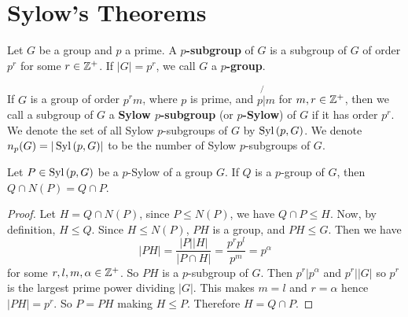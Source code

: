 \section{Sylow's Theorems}
\label{section_4.5}

\begin{definition}
  Let $G$ be a group and $p$ a prime. A  \textbf{$p$-subgroup} of $G$ is a
  subgroup of $G$ of order  $p^r$ for some $r \in \mathbb{Z}^+$. If $|G|=p^r$, we
  call  $G$ a  \textbf{$p$-group}.
\end{definition}

\begin{definition}
  If $G$ is a group of order  $p^rm$, where  $p$ is prime, and  $p \not{|} m$
  for  $m,r \in \mathbb{Z}^+$, then we call a subgroup of $G$ a \textbf{Sylow
  $p$-subgroup} (or \textbf{$p$-Sylow}) of $G$ if it has order $p^r$. We
  denote the set of all Sylow $p$-subgroups of $G$ by  $\operatorname{Syl}{(p,G)}$. We
  denote $n_p(G)=|\operatorname{Syl}{(p,G)}|$ to be the number of Sylow $p$-subgroups of
  $G$.
\end{definition}

\begin{proposition}\label{proposition_4.5.1}
  Let $P \in \operatorname{Syl}{(p,G)}$ be a $p$-Sylow of a group  $G$. If  $Q$ is a
  $p$-group of  $G$, then  $Q \cap N(P)=Q \cap P$.
\end{proposition}
\begin{proof}
  Let $H=Q \cap N(P)$, since $P \leq N(P)$, we have $Q \cap P \leq H$. Now, by
  definition, $H \leq Q$. Since $H \leq N(P)$, $PH$ is a group, and  $PH \leq
  G$. Then we have
  \begin{equation*}
    |PH|=\frac{|P||H|}{|P \cap H|}=\frac{p^rp^l}{p^m}=p^\alpha
  \end{equation*}
  for some $r,l,m,\alpha \in \mathbb{Z}^+$. So $PH$ is a  $p$-subgroup of  $G$. Then
  $p^r|p^\alpha$ and  $p^r||G|$ so $p^r$ is the largest prime power
  dividing  $|G|$. This makes $m=l$ and $r=\alpha$ hence $|PH|=p^r$.
  So $P=PH$ making $H \leq P$. Therefore $H=Q \cap P$.
\end{proof}

